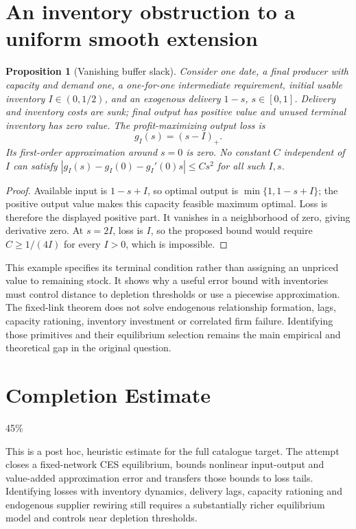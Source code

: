 \documentclass[11pt,a4paper]{article}
\newtheorem{proposition}[theorem]{Proposition}
\theoremstyle{definition}
\theoremstyle{remark}
\begin{document}
\section{An inventory obstruction to a uniform smooth extension}
\begin{proposition}[Vanishing buffer slack]\label{pr:buffer}
Consider one date, a final producer with capacity and demand one, a one-for-one intermediate requirement, initial usable inventory $I\in(0,1/2)$, and an exogenous delivery $1-s$, $s\in[0,1]$. Delivery and inventory costs are sunk; final output has positive value and unused terminal inventory has zero value. The profit-maximizing output loss is
\[
 g_I(s)=(s-I)_+.
\]
Its first-order approximation around $s=0$ is zero. No constant $C$ independent of $I$ can satisfy $|g_I(s)-g_I(0)-g_I'(0)s|\leq Cs^2$ for all such $I,s$.
\end{proposition}
\begin{proof}
Available input is $1-s+I$, so optimal output is $\min\{1,1-s+I\}$; the positive output value makes this capacity feasible maximum optimal. Loss is therefore the displayed positive part. It vanishes in a neighborhood of zero, giving derivative zero. At $s=2I$, loss is $I$, so the proposed bound would require $C\geq1/(4I)$ for every $I>0$, which is impossible.
\end{proof}

This example specifies its terminal condition rather than assigning an unpriced value to remaining stock. It shows why a useful error bound with inventories must control distance to depletion thresholds or use a piecewise approximation. The fixed-link theorem does not solve endogenous relationship formation, lags, capacity rationing, inventory investment or correlated firm failure. Identifying those primitives and their equilibrium selection remains the main empirical and theoretical gap in the original question.

\section{Completion Estimate}
45\%

This is a post hoc, heuristic estimate for the full catalogue target.
The attempt closes a fixed-network CES equilibrium, bounds nonlinear input-output and value-added approximation error and transfers those bounds to loss tails. Identifying losses with inventory dynamics, delivery lags, capacity rationing and endogenous supplier rewiring still requires a substantially richer equilibrium model and controls near depletion thresholds.
\end{document}
